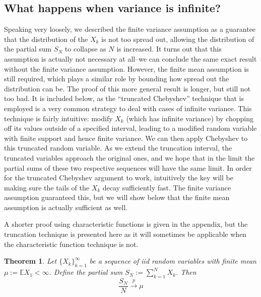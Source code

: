 \documentclass[12pt]{article}
\newcommand{\E}{\mathbb{E}}
\newtheorem{thm}{Theorem}
\begin{document}
\subsection{What happens when variance is infinite?}
Speaking very loosely, we described the finite variance assumption as a guarantee that the distribution of the $X_k$ is not too spread out, allowing the distribution of the partial sum $S_N$ to collapse as $N$ is increased. 
It turns out that this assumption is actually not necessary at all--we can conclude the same exact result without the finite variance assumption. However, the finite mean assumption is still required, which plays a similar role by 
bounding how spread out the distribution can be. The proof of this more general result is longer, but still not too bad. It is included below, as the ``truncated Chebyshev'' technique that is employed is a very common strategy to 
deal with cases of infinite variance. This technique is fairly intuitive: modify $X_k$ (which has infinite variance) by chopping off its values outside of a specified interval, leading to a modified random variable with finite support and 
hence finite variance. We can then apply Chebyshev to this truncated random variable. As we extend the truncation interval, the truncated variables approach the original ones, and we hope that in the limit the partial sums of these 
two respective sequences will have the same limit. In order for the truncated Chebyshev argument to work, intuitively the key will be making sure the tails of the $X_k$ decay sufficiently fast. The finite variance assumption guaranteed
this, but we will show below that the finite mean assumption is actually sufficient as well. 

A shorter proof using characteristic functions is given in the appendix, but the truncation technique is presented here as it will sometimes be applicable when the 
characteristic function technique is not. 

\begin{thm}
Let $\{X_k\}_{k = 1}^{\infty}$ be a sequence of iid random variables with finite mean $\mu := \E X_1 < \infty$. Define the partial sum $S_N := \sum_{k = 1}^{N} X_k$. Then 
\[\frac{S_N}{N} \overset{p}{\to} \mu\]
\end{thm}
\end{document}
